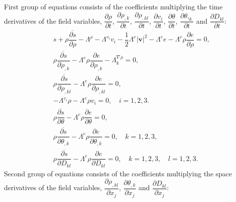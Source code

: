 \documentclass[a4paper,fleqn]{cas-sc}
\theoremstyle{definition}
\begin{document}
First group of equations consists of the coefficients multiplying the time derivatives of the field variables, $\dfrac{\partial\rho}{\partial t}$, $\dfrac{\partial\rho_{,k}}{\partial t}$, $\dfrac{\partial\rho_{,kl}}{\partial t}$, $\dfrac{\partial v_i}{\partial t}$, $\dfrac{\partial\theta}{\partial t}$, $\dfrac{\partial\theta{,_k}}{\partial t}$ and $\dfrac{\partial D_{kl}}{\partial t}$: 
\begin{align}
	\label{Trho Kortevegovi fluidi}
	& s+\rho\overline{\dfrac{\partial s}{\partial\rho}}-\Lambda^\rho-\Lambda^{v_i}v_i-\dfrac{1}{2}\Lambda^e|\mathbf{v}|^2-\Lambda^ e e-\Lambda^e\rho\dfrac{\partial e}{\partial\rho}=0, 
	\\
	\label{Trho_,k Kortevegovi fluidi}
	& \rho\overline{\dfrac{\partial s}{\partial\rho_{,k}}}-\Lambda^e\rho\dfrac{\partial e}{\partial\rho_{,k}}-\Lambda^{\nabla\rho}_k=0, 
	\\
	& \label{Trho_,kl Kortevegovi fluidi}
	\rho\overline{\dfrac{\partial s}{\partial\rho_{,kl}}}-\Lambda^e\rho\dfrac{\partial e}{\partial\rho_{,kl}}=0,
	\\
	\label{Tv_i Kortevegovi fluidi}
	& -\Lambda^{v_i}\rho-\Lambda^e\rho v_i=0,\quad i=1,2,3. 
	\\
	\label{Ttheta Kortevegovi fluidi}
	& \rho\overline{\dfrac{\partial s}{\partial\theta}}-\Lambda^e\rho\dfrac{\partial e}{\partial\theta}=0, 
	\\
	\label{Ttheta_,k Kortevegovi fluidi}
	& \rho\overline{\dfrac{\partial s}{\partial\theta_{,k}}}-\Lambda^e\rho\dfrac{\partial e}{\partial\theta_{,k}}=0, \quad k=1,2,3,
	\\
	\label{TD_kl Kortevegovi fluidi}
	& \rho\overline{\dfrac{\partial s}{\partial D_{kl}}}-\Lambda^e\rho\dfrac{\partial e}{\partial D_{kl}}=0, \quad k=1,2,3, \quad l=1,2,3.
\end{align}
Second group of equations consists of the coefficients multiplying the space derivatives of the field variables, $\dfrac{\partial\rho_{,kl}}{\partial x_j}$, $\dfrac{\partial\theta_{,k}}{\partial x_j}$ and $\dfrac{\partial D_{kl}}{\partial x_j}$:  
\end{document}
